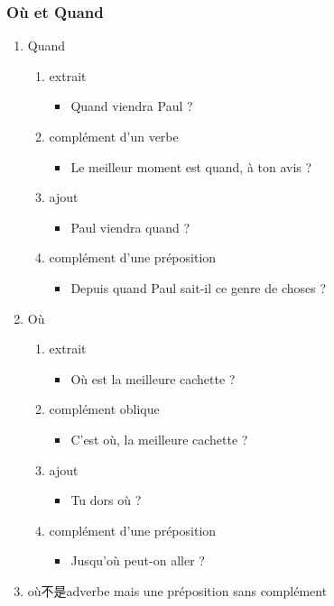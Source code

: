 \documentclass[UTF8]{report}
\begin{document}
\subsubsection{Où et Quand}
\begin{enumerate}
    \item Quand
    \begin{enumerate}
        \item extrait
        \begin{itemize}
            \item Quand viendra Paul ?
        \end{itemize}
        \item complément d’un verbe
        \begin{itemize}
            \item Le meilleur moment est quand, à ton avis ?
        \end{itemize}
        \item ajout
        \begin{itemize}
            \item Paul viendra quand ?
        \end{itemize}
        \item complément d’une préposition
        \begin{itemize}
            \item Depuis quand Paul sait-il ce genre de choses ?
        \end{itemize}
    \end{enumerate}
    \item Où
    \begin{enumerate}
        \item extrait
        \begin{itemize}
            \item Où est la meilleure cachette ?
        \end{itemize}
        \item complément oblique
        \begin{itemize}
            \item C’est où, la meilleure cachette ?
        \end{itemize}
        \item ajout
        \begin{itemize}
            \item Tu dors où ?
        \end{itemize}
        \item complément d’une préposition
        \begin{itemize}
            \item Jusqu’où peut-on aller ?
        \end{itemize}
    \end{enumerate}
    \item où不是adverbe mais une préposition sans complément
\end{enumerate}
\end{document}
